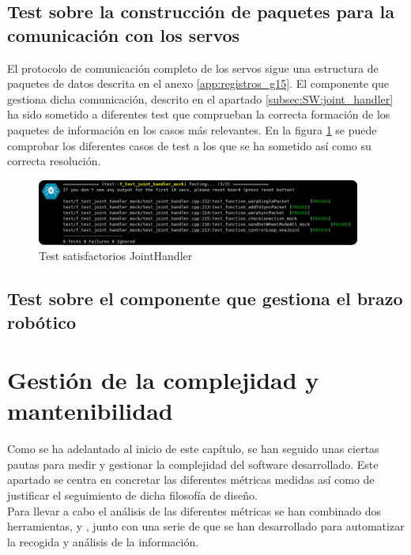     \subsection{Test sobre la construcción de paquetes para la comunicación con los servos}
        El protocolo de comunicación completo de los servos sigue una estructura de paquetes de datos descrita en el anexo \ref{app:registros_g15}. El componente que gestiona dicha comunicación, descrito en el apartado \ref{subsec:SW:joint_handler} ha sido sometido a diferentes test que comprueban la correcta formación de los paquetes de información en los casos más relevantes. En la figura \ref{fig:SW:test:joint_handler_ok} se puede comprobar los diferentes casos de test a los que se ha sometido así como su correcta resolución.
        \begin{figure}[H]
            \centering
            \includegraphics[width=0.95\textwidth]{figuras/Imagenes_SW/test/SWTest_5.jpg}
            \caption{Test satisfactorios JointHandler}
            \label{fig:SW:test:joint_handler_ok}
        \end{figure}

    \subsection{Test sobre el componente que gestiona el brazo robótico}
\section{Gestión de la complejidad y mantenibilidad} \label{sec:SW:gestion_complejidad}
    Como se ha adelantado al inicio de este capítulo, se han seguido unas ciertas pautas para medir y gestionar la complejidad del software desarrollado. Este apartado se centra en concretar las diferentes métricas medidas así como de justificar el seguimiento de dicha filosofía de diseño.
    \\
    
    Para llevar a cabo el análisis de las diferentes métricas se han combinado dos herramientas,  y , junto con una serie de  que se han desarrollado para automatizar la recogida y análisis de la información.
    \\
    
